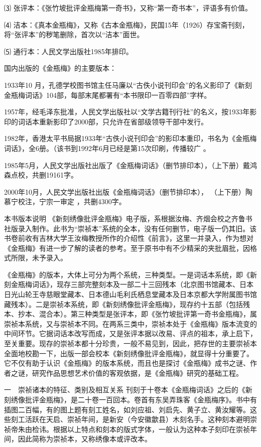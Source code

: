 \documentclass[a4paper,12pt,UTF8,twoside]{ctexbook}
\begin{document}
⑶ 张评本：《张竹坡批评金瓶梅第一奇书》，又称“第一奇书本”，评语多有价值。

⑷ 洁本：《真本金瓶梅》，又称《古本金瓶梅》，民国15年（1926）存宝斋刊刻，将“张评本”的秽笔删除，首次以“洁本”面世。

⑸ 通行本：人民文学出版社1985年排印。

国内出版的《金瓶梅》的主要版本：

1933年10 月，孔德学校图书馆主任马廉以“古佚小说刊印会”的名义影印了《新刻金瓶梅词话》104部，每部末尾都署有“本书限印一百零四部”字样。

1957年，经毛泽东批准，人民文学出版社以“文学古籍刊行社”的名义，按1933年影印的词话本重新影印了2000部，只允许在省部级领导干部中发行。

1982年，香港太平书局据1933年“古佚小说刊印会”的影印本重印，书名为《金瓶梅词话》，全6册。（该书到1992年6月已经是第15次印刷，传播较广 。

1985年5月，人民文学出版社出版了《金瓶梅词话》（删节排印本），（上下册）戴鸿森点校，共删19161字。

2000年10月，人民文学出版社出版《金瓶梅词话》（删节排印本）， （上下册）陶慕宁校注，宁宗一审定 ，共删4300字。

本书版本说明
《新刻绣像批评金瓶梅》电子版，系根据汝梅、齐烟会校之齐鲁书社版录入制作。此书为“崇祯本”系统的全本，没有任何删节，电子版一仍其旧。该书卷前收有吉林大学王汝梅教授所作的介绍性《前言》，这里一并录入，作为想对《金瓶梅》有进一步了解的读者的参考。至于原书中有不少精采的夹批眉批，因格式所限，未予录入。

《金瓶梅》的版本，大体上可分为两个系统，三种类型。一是词话本系统，即《新刻金瓶梅词话》，现存三部完整刻本及一部二十三回残本（北京图书馆藏本、日本日光山轮王寺慈眼堂藏本、日本德山毛利氏栖息堂藏本及日本京都大学附属图书馆藏残本）。二是崇祯本系统，即《新刻绣像批评金瓶梅》，现存约十五部（包括残本、抄本、混合本）。第三种类型是张评本，即《张竹坡批评第一奇书金瓶梅》，属崇祯本系统，又与崇祯本不同。在两系三类中，崇祯本处于《金瓶梅》版本流变的中间环节。它据词话本改写而成，又是张评本据以改易、评点的祖本，承上启下，至关重要。现存的崇祯本都十分珍贵，一般不易见到，因此，把存世的主要崇祯本全面地校勘一下，出版一部会校本《新刻绣像批评金瓶梅》，就显得十分重要了。它不仅有助于认识《金瓶梅》的版本系统，而且也是探讨《金瓶梅》成书之谜、作者之谜，研究作品思想艺术价值的客观依据，是《金瓶梅》研究的基础工程。

一　崇祯诸本的特征、类别及相互关系
刊刻于十卷本《金瓶梅词话》之后的《新刻绣像批评金瓶梅》，是二十卷一百回本。卷首有东吴弄珠客《金瓶梅序》。书中有插图二百幅，有的图上题有刻工姓名，如刘应祖、刘启先、黄子立、黄汝耀等。这些刻工活跃在天启、崇祯年间，是新安（今安徽歙县）木刻名手。这种刻本避明崇祯帝朱由检讳。根据以上特点和刻本的版式字体，一般认为这种本子刻印在崇祯年间，因此简称为崇祯本，又称绣像本或评改本。
\end{document}

